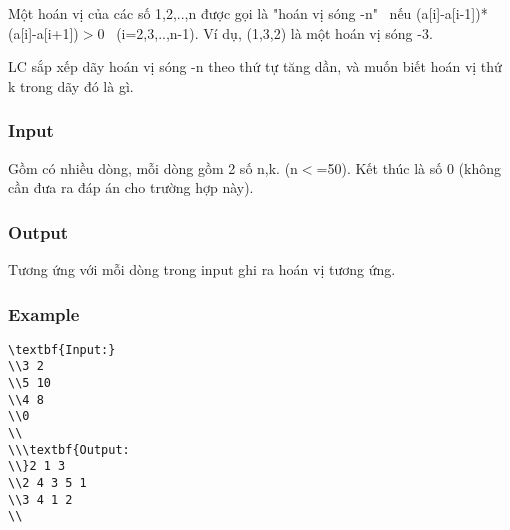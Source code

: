 



   Một hoán vị của các số 1,2,..,n được gọi là "hoán vị sóng -n"  nếu  (a[i]-a[i-1])*(a[i]-a[i+1])$>$0  (i=2,3,..,n-1). Ví dụ, (1,3,2) là một hoán vị sóng -3.  

   LC sắp xếp dãy hoán vị sóng -n theo thứ tự tăng dần, và muốn biết hoán vị thứ k trong dãy đó là gì.  

\subsubsection{   Input  }

   Gồm có nhiều dòng, mỗi dòng gồm 2 số n,k. (n$<$=50). Kết thúc là số 0 (không cần đưa ra đáp án cho trường hợp này).  

\subsubsection{   Output  }

   Tương ứng với mỗi dòng trong  input ghi ra hoán vị tương ứng.  

\subsubsection{   Example  }
\begin{verbatim}
\textbf{Input:}
\\3 2
\\5 10
\\4 8
\\0
\\
\\\textbf{Output:
\\}2 1 3
\\2 4 3 5 1
\\3 4 1 2
\\\end{verbatim}